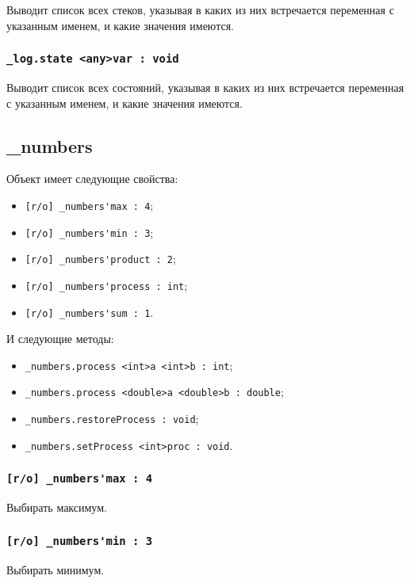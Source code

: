 \documentclass[a4paper, 14pt]{extarticle}
\newenvironment{icItems}
	{ \begin{itemize} [noitemsep,nolistsep] }
	{ \end{itemize} }
\begin{document}
Выводит список всех стеков, указывая в каких из них встречается переменная с указанным именем, и какие значения имеются.

\subsubsection{\lstinline|_log.state <any>var : void|}

Выводит список всех состояний, указывая в каких из них встречается переменная с указанным именем, и какие значения имеются.

\subsection{{\color{orange} \_numbers}}

Объект \numbers{} имеет следующие свойства:
\begin{icItems}
	\item \lstinline|[r/o] _numbers'max : 4|;
	\item \lstinline|[r/o] _numbers'min : 3|;
	\item \lstinline|[r/o] _numbers'product : 2|;
	\item \lstinline|[r/o] _numbers'process : int|;
	\item \lstinline|[r/o] _numbers'sum : 1|.
\end{icItems}

И следующие методы:
\begin{icItems}
	\item \lstinline|_numbers.process <int>a <int>b : int|;
	\item \lstinline|_numbers.process <double>a <double>b : double|;
	\item \lstinline|_numbers.restoreProcess : void|;
	\item \lstinline|_numbers.setProcess <int>proc : void|.
\end{icItems}

\subsubsection{\lstinline|[r/o] _numbers'max : 4|}

Выбирать максимум.

\subsubsection{\lstinline|[r/o] _numbers'min : 3|}

Выбирать минимум.
\end{document}
